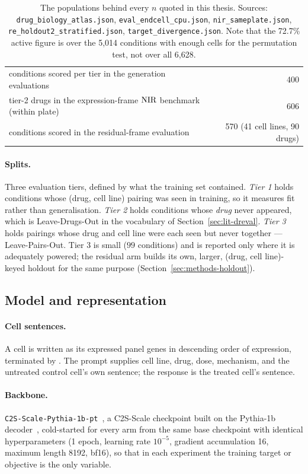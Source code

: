 \begin{table}[h]
\begin{tabular}{lr}
conditions scored per tier in the generation evaluations & 400 \\
tier-2 drugs in the expression-frame $\textrm{NIR}$ benchmark (within plate) & 606 \\
conditions scored in the residual-frame evaluation & 570 (41 cell lines, 90 drugs) \\
\bottomrule
\end{tabular}
\caption{The populations behind every $n$ quoted in this thesis. Sources:
\texttt{drug\_biology\_atlas.json}, \texttt{eval\_endcell\_cpu.json},
\texttt{nir\_sameplate.json}, \texttt{re\_holdout2\_stratified.json},
\texttt{target\_divergence.json}. Note that the 72.7\% active figure is over the 5,014 conditions
with enough cells for the permutation test, not over all 6,628.}
\label{tab:scale}
\end{table}

\paragraph{Splits.} Three evaluation tiers, defined by what the training set contained.
\emph{Tier 1} holds conditions whose (drug, cell line) pairing was seen in training, so it measures
fit rather than generalisation. \emph{Tier 2} holds conditions whose \emph{drug} never appeared,
which is Leave-Drugs-Out in the vocabulary of Section~\ref{sec:lit-dreval}. \emph{Tier 3} holds
pairings whose drug and cell line were each seen but never together --- Leave-Pairs-Out. Tier 3 is
small ($99$ conditions) and is reported only where it is adequately powered; the residual arm builds
its own, larger, (drug, cell line)-keyed holdout for the same purpose
(Section~\ref{sec:methods-holdout}).

\subsection{Model and representation}

\paragraph{Cell sentences.} A cell is written as its expressed panel genes in descending order of
expression, terminated by \ENDCELL. The prompt supplies cell line, drug, dose, mechanism, and the
untreated control cell's own sentence; the response is the treated cell's sentence.

\paragraph{Backbone.} \texttt{C2S-Scale-Pythia-1b-pt}~\cite{c2sscale}, a C2S-Scale checkpoint built
on the Pythia-1b decoder~\cite{pythia}, cold-started for every arm from the same base checkpoint with
identical hyperparameters (1 epoch, learning rate $10^{-5}$, gradient accumulation 16, maximum
length 8192, bf16), so that in each experiment the training target or objective is the only
variable.


